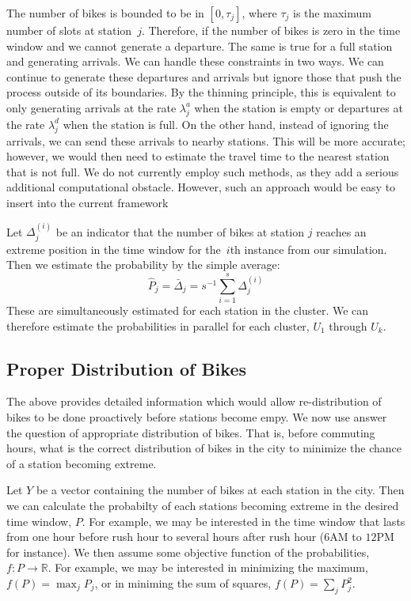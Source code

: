 \documentclass{acm_proc_article-sp}
\begin{document}
The number of bikes is bounded to be in $[0, \tau_j]$, where $\tau_j$ is the maximum number of slots at station~$j$.  Therefore, if the number of bikes is zero in the time window and we cannot generate a departure.  The same is true for a full station and generating arrivals.  We can handle these constraints in two ways.  We can continue to generate these departures and arrivals but ignore those that push the process outside of its boundaries.  By the thinning principle, this is equivalent to only generating arrivals at the rate $\lambda^{a}_j$ when the station is empty or departures at the rate $\lambda^{d}_j$ when the station is full.   On the other hand, instead of ignoring the arrivals, we can send these arrivals to nearby stations.  This will be more accurate; however, we would then need to estimate the travel time to the nearest station that is not full.  We do not currently employ such methods, as they add a serious additional computational obstacle.  However, such an approach would be easy to insert into the current framework

Let $\Delta^{(i)}_j$ be an indicator that the number of bikes at station $j$ reaches an extreme position in the time window for the~$i$th instance from our simulation.  Then we estimate the probability by the simple average:
\begin{equation*}
\hat{P}_j = \bar{\Delta}_j = s^{-1} \sum_{i=1}^s \Delta^{(i)}_j
\end{equation*}
\noindent  These are simultaneously estimated for each station in the cluster.  We can therefore estimate the probabilities in parallel for each cluster, $U_1$ through $U_k$.

\subsection{Proper Distribution of Bikes}

The above provides detailed information which would allow re-distribution of bikes to be done proactively before stations become empy.  We now use answer the question of appropriate distribution of bikes.  That is, before commuting hours, what is the correct distribution of bikes in the city to minimize the chance of a station becoming extreme. 

Let $Y$ be a vector containing the number of bikes at each station in the city.  Then we can calculate the probabilty of each stations becoming extreme in the desired time window, $P$.  For example, we may be interested in the time window that lasts from one hour before rush hour to several hours after rush hour ($6$AM to $12$PM for instance).  We then assume some objective function of the probabilities, $f: P \rightarrow \mathbb{R}$.  For example, we may be interested in minimizing the maximum, $f(P) = \max_j P_j$, or in miniming the sum of squares, $f(P) = \sum_j P_j^2$.  
\end{document}
